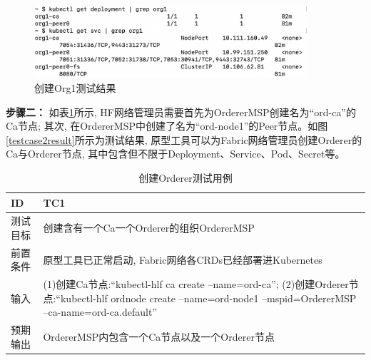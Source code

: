\begin{figure}[h] %
    \centering %
    \includegraphics[width=0.9\textwidth]{FIGs/chapter5/peer.png} %
    \caption{创建Org1测试结果} %
    \label{testcase1result} %
\end{figure}%

\textbf{步骤二：} 如表\ref{orderer_test}所示, HF网络管理员需要首先为OrdererMSP创建名为“ord-ca”的Ca节点; 其次, 在OrdererMSP中创建了名为“ord-node1”的Peer节点。如图\ref{testcase2result}所示为测试结果, 原型工具可以为Fabric网络管理员创建Orderer的Ca与Orderer节点, 其中包含但不限于Deployment、Service、Pod、Secret等。

{\footnotesize
\begin{longtable}[h]{m{60pt}|m{280pt}}
    \caption[创建Orderer测试用例]{创建Orderer测试用例} \label{orderer_test}\\
        \hline  
        ID&TC1\\
        \hline
        测试目标&创建含有一个Ca一个Orderer的组织OrdererMSP\\
        \hline
        前置条件&原型工具已正常启动, Fabric网络各CRDs已经部署进Kubernetes\\
        \hline
        输入& (1)创建Ca节点:“kubectl-hlf ca create --name=ord-ca”;
        \newline (2)创建Orderer节点:“kubectl-hlf ordnode create --name=ord-node1 --mspid=OrdererMSP --ca-name=ord-ca.default” \\

        \hline 
        预期输出& OrdererMSP内包含一个Ca节点以及一个Orderer节点\\
        \hline
    \end{longtable} 
}

